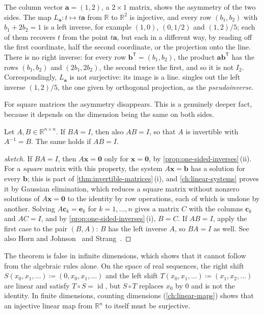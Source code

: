 The column vector $\mathbf a=(1,2)$, a $2\times1$ matrix, shows the asymmetry of the two sides. The map $L_{\mathbf a}\colon t\mapsto t\mathbf a$ from $\mathbb R$ to $\mathbb R^2$ is injective, and every row $(b_1,b_2)$ with $b_1+2b_2=1$ is a left inverse, for example $(1,0)$, $(0,1/2)$ and $(1,2)/5$; each of them recovers $t$ from the point $t\mathbf a$, but each in a different way, by reading off the first coordinate, half the second coordinate, or the projection onto the line. There is no right inverse: for every row $\mathbf b^{\mathsf T}=(b_1,b_2)$, the product $\mathbf a\mathbf b^{\mathsf T}$ has the rows $(b_1,b_2)$ and $(2b_1,2b_2)$, the second twice the first, and so it is not $I_2$. Correspondingly, $L_{\mathbf a}$ is not surjective: its image is a line.  singles out the left inverse $(1,2)/5$, the one given by orthogonal projection, as the \emph{pseudoinverse}.

For square matrices the asymmetry disappears. This is a genuinely deeper fact, because it depends on the dimension being the same on both sides.

\begin{theorem}
\label{thm:one-sided-square}
Let $A,B\in\mathbb R^{n\times n}$. If $BA=I$, then also $AB=I$, so that $A$ is invertible with $A^{-1}=B$. The same holds if $AB=I$.
\end{theorem}

\begin{proof}[sketch]
If $BA=I$, then $A\mathbf x=\mathbf 0$ only for $\mathbf x=\mathbf 0$, by \cref{prop:one-sided-inverses}\,(ii). For a \emph{square} matrix with this property, the system $A\mathbf x=\mathbf b$ has a solution for every $\mathbf b$; this is part of \cref{thm:invertible-matrices}\,(i), and \cref{ch:linear-systems} proves it by Gaussian elimination, which reduces a square matrix without nonzero solutions of $A\mathbf x=\mathbf 0$ to the identity by row operations, each of which is undone by another. Solving $A\mathbf c_k=\mathbf e_k$ for $k=1,\ldots,n$ gives a matrix $C$ with the columns $\mathbf c_k$ and $AC=I$, and by \cref{prop:one-sided-inverses}\,(i), $B=C$. If $AB=I$, apply the first case to the pair $(B,A)$: $B$ has the left inverse $A$, so $BA=I$ as well. See also Horn and Johnson~\cite[Sect.~0.5]{horn2013} and Strang~\cite[Sect.~2.5]{strang2016}.
\end{proof}

The theorem is false in infinite dimensions, which shows that it cannot follow from the algebraic rules alone. On the space of real sequences, the right shift $S(x_0,x_1,\ldots)\coloneqq(0,x_0,x_1,\ldots)$ and the left shift $T(x_0,x_1,\ldots)\coloneqq(x_1,x_2,\ldots)$ are linear and satisfy $T\circ S=\operatorname{id}$, but $S\circ T$ replaces $x_0$ by $0$ and is not the identity. In finite dimensions, counting dimensions (\cref{ch:linear-maps}) shows that an injective linear map from $\mathbb R^n$ to itself must be surjective.

